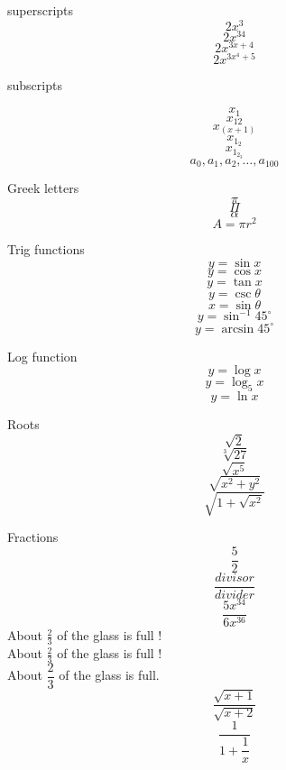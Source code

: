 \documentclass[12pts]{article}
\begin{document}
superscripts $$2x^3$$
$$2x^{34}$$
$$2x^{3x+4}$$
$$2x^{3x^4+5}$$

subscripts

$$x_1$$
$$x_{12}$$
$$x_{(x+1)}$$
$$x_{1_2}$$
$$x_{1_{2_3}}$$
$$a_0, a_1, a_2, \ldots, a_{100} $$

Greek letters
$$\pi$$
$$\Pi$$
$$\alpha$$
$$A= \pi r^2$$

Trig functions
$$ y = \sin x $$
$$ y = \cos x $$
$$ y = \tan x $$
$$y= \csc \theta $$
$$ x = \sin \theta $$
$$ y = \sin^{-1} 45^{\circ} $$
$$ y = \arcsin 45^{\circ} $$

Log function
$$ y = \log x $$
$$ y = \log_5 x $$
$$y = \ln x $$

Roots
$$ \sqrt{2}$$
$$ \sqrt[3]{27}$$
$$ \sqrt{x^{5}}$$
$$ \sqrt{x^{2} + y^{2}}$$
$$\sqrt{  1 + \sqrt{x^2}   }$$



Fractions
$$\frac{5}{2}$$
$$\frac{divisor}{divider}$$
$$\frac{5x^{34}}{6x^{36}}$$
About $\displaystyle\frac{2}{3}$ of the glass is full ! \\[16pt]
About $\frac{2}{3}$ of the glass is full ! \\ [16pt]
About $\dfrac{2}{3}$ of the glass is full. 
$$ \frac{\sqrt{x+1}}{\sqrt{x+2}}$$
$$\frac{1}{1+\dfrac{1}{x}}$$
\end{document}
